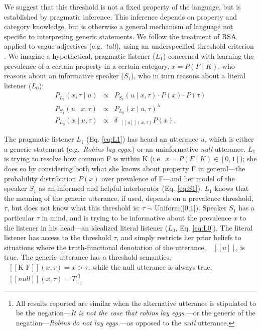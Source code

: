\documentclass{pnastwo}
\newcommand{\denote}[1]{\mbox{ $[\![ #1 ]\!]$}}
\begin{document}
\begin{article}
We suggest that this threshold is not a fixed property of the language, but is established by pragmatic inference.
This inference depends on property and category knowledge, but is otherwise a general mechanism of language not specific to interpreting generic statements.
We follow the treatment of RSA applied to vague adjectives (e.g.~\emph{tall}), using an underspecified threshold criterion \cite{Lassiter2013,Lassiter2015}. %
We imagine a hypothetical, pragmatic listener ($L_1$) concerned with learning the prevalence of a certain property in a certain category, $x=P(F \mid K)$, who reasons about an informative speaker ($S_1$), who in turn reasons about a literal listener ($L_0$):
\begin{eqnarray}
P_{L_{1}}(x , \tau \mid u) &\propto& P_{S_{1}}(u \mid x, \tau) \cdot P(x) \cdot P(\tau) \label{eq:L1}\\
P_{S_{1}}(u \mid x, \tau) &\propto&  {P_{L_{0}}(x \mid u, \tau)}^{\lambda} \label{eq:S1}\\
P_{L_{0}}(x \mid u, \tau) &\propto& {\delta_{\denote{u}(x, \tau)} P(x)}. \label{eq:L0}
\end{eqnarray}




The pragmatic listener $L_{1}$ (Eq. \ref{eq:L1}) has heard an utterance $u$, which is either a generic statement (e.g.~\emph{Robins lay eggs.}) or an uninformative \emph{null} utterance. 
$L_1$ is trying to resolve how common F is within K (i.e.~$x = P(F\mid K) \in [0, 1]$); she does so by considering both what she knows about property F in general---the probability distribution $P(x)$ over prevalence of F---and her model of the speaker $S_{1}$ as an informed and helpful interlocutor (Eq. \ref{eq:S1}).
$L_1$ knows that the meaning of the generic utterance, if used, depends on a prevalence threshold, $\tau$, but does not know what this threshold is: $\tau \sim \text{Uniform([0,1])}$.
Speaker $S_1$ has a particular $\tau$ in mind, and is trying to be informative about the prevalence $x$ to the listener in his head---an idealized literal listener ($L_{0}$, Eq. \ref{eq:L0}).
The literal listener has access to the threshold $\tau$, and simply restricts her prior beliefs to situations where the truth-functional denotation of the utterance, $\denote{u}$, is true.
The generic utterance has a threshold semantics, $\denote{\text{K F}}(x, \tau)=x>\tau$; while the null utterance is always true, $\denote{null}(x, \tau)=T$.\footnote{All results reported are similar when the alternative utterance is stipulated to be the negation---\emph{It is not the case that robins lay eggs.}---or the generic of the negation---\emph{Robins do not lay eggs.}---as opposed to the \emph{null} utterance.}



\end{article}
\end{document}
